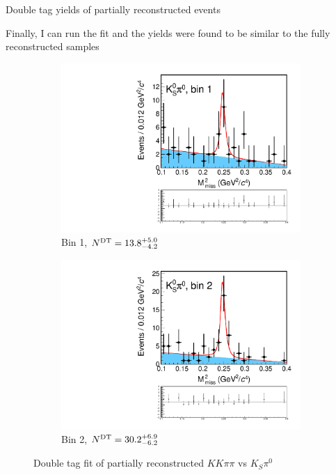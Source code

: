 \documentclass{beamer}
\begin{document}
\begin{frame}{Double tag yields of partially reconstructed events}
  \begin{center}
    Finally, I can run the fit and the yields were found to be similar to the fully reconstructed samples
  \end{center}
  \begin{figure}
    \centering
    \begin{subfigure}{0.4\textwidth}
      \includegraphics[width = 1.0\textwidth,trim={0 5cm 0 0},clip=true]{Plots/DoubleTagYield_DoubleTag_CP_KKpipi_vs_KSpi0PartReco_SignalBin1.pdf}
      \caption{Bin 1, $N^{\rm DT} = 13.8^{+5.0}_{-4.2}$}
    \end{subfigure}%
    \begin{subfigure}{0.4\textwidth}
      \includegraphics[width = 1.0\textwidth,trim={0 5cm 0 0},clip=true]{Plots/DoubleTagYield_DoubleTag_CP_KKpipi_vs_KSpi0PartReco_SignalBin2.pdf}
      \caption{Bin 2, $N^{\rm DT} = 30.2^{+6.9}_{-6.2}$}
    \end{subfigure}
    \caption{Double tag fit of partially reconstructed $KK\pi\pi$ vs $K_S\pi^0$}
  \end{figure}
\end{frame}
\end{document}
